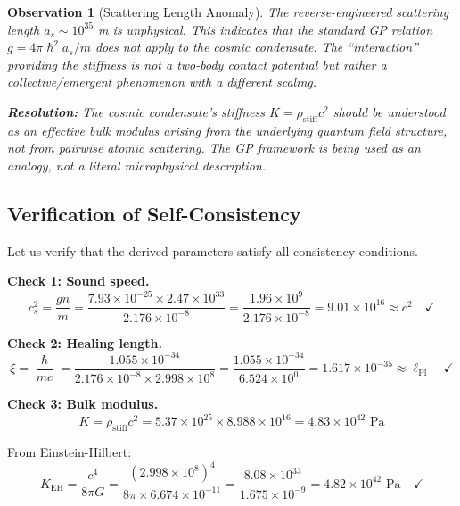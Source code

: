 \documentclass[11pt,a4paper]{article}
\newcommand{\ee}[1]{\times 10^{#1}}
\newcommand{\hbar}{\ensuremath{\hslash}}
\newcommand{\lPl}{\ensuremath{\ell_{\mathrm{Pl}}}}
\newcommand{\rhostiff}{\ensuremath{\rho_{\mathrm{stiff}}}}
\newtheorem{observation}{Observation}
\theoremstyle{definition}
\begin{document}
\begin{observation}[Scattering Length Anomaly]
\label{obs:scattering_anomaly}
The reverse-engineered scattering length $a_s \sim 10^{35}$ m is unphysical. This indicates that the standard GP relation $g = 4\pi\hbar^2 a_s/m$ does not apply to the cosmic condensate. The ``interaction'' providing the stiffness is not a two-body contact potential but rather a collective/emergent phenomenon with a different scaling.

\textbf{Resolution:} The cosmic condensate's stiffness $K = \rhostiff c^2$ should be understood as an \emph{effective} bulk modulus arising from the underlying quantum field structure, not from pairwise atomic scattering. The GP framework is being used as an \emph{analogy}, not a literal microphysical description.
\end{observation}

\subsection{Verification of Self-Consistency}
\label{sec:verification}

Let us verify that the derived parameters satisfy all consistency conditions.

\textbf{Check 1: Sound speed.}
\begin{equation}
c_s^2 = \frac{gn}{m} = \frac{7.93 \ee{-25} \times 2.47 \ee{33}}{2.176 \ee{-8}} = \frac{1.96 \ee{9}}{2.176 \ee{-8}} = 9.01 \ee{16} \approx c^2 \quad \checkmark
\end{equation}

\textbf{Check 2: Healing length.}
\begin{equation}
\xi = \frac{\hbar}{mc} = \frac{1.055 \ee{-34}}{2.176 \ee{-8} \times 2.998 \ee{8}} = \frac{1.055 \ee{-34}}{6.524 \ee{0}} = 1.617 \ee{-35} \approx \lPl \quad \checkmark
\end{equation}

\textbf{Check 3: Bulk modulus.}
\begin{equation}
K = \rhostiff c^2 = 5.37 \ee{25} \times 8.988 \ee{16} = 4.83 \ee{42} \text{ Pa}
\end{equation}

From Einstein-Hilbert:
\begin{equation}
K_{\mathrm{EH}} = \frac{c^4}{8\pi G} = \frac{(2.998 \ee{8})^4}{8\pi \times 6.674 \ee{-11}} = \frac{8.08 \ee{33}}{1.675 \ee{-9}} = 4.82 \ee{42} \text{ Pa} \quad \checkmark
\end{equation}
\end{document}

